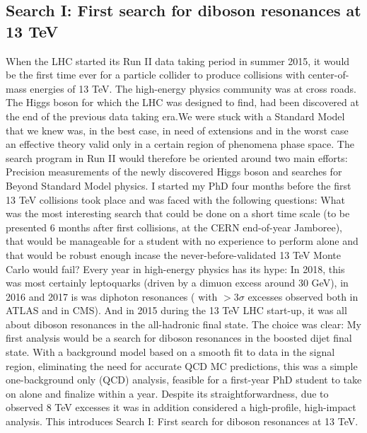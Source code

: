 \vspace*{\fill}
\begin{centering}
\section*{Search I: First search for diboson resonances at 13 TeV}
When the LHC started its Run II data taking period in summer 2015, it would be the first time ever for a particle collider to produce collisions with center-of-mass energies of 13 TeV. The high-energy physics community was at cross roads. The Higgs boson for which the LHC was designed to find, had been discovered at the end of the previous data taking era.We were stuck with a Standard Model that we knew was, in the best case, in need of extensions and in the worst case an effective theory valid only in a certain region of phenomena phase space. The search program in Run II would therefore be oriented around two main efforts: Precision measurements of the newly discovered Higgs boson and searches for Beyond Standard Model physics.\newline\newline
I started my PhD four months before the first 13 TeV collisions took place and was faced with the following questions:
What was the most interesting search that could be done on a short time scale (to be presented 6 months after first collisions, at the CERN end-of-year Jamboree), that would be manageable for a student with no experience to perform alone and that would be robust enough incase the never-before-validated 13 TeV Monte Carlo would fail? \newline\newline
Every year in high-energy physics has its hype: In 2018, this was most certainly leptoquarks (driven by a dimuon excess around 30 GeV), in 2016 and 2017 is was diphoton resonances ( with  $>3\sigma$ excesses observed both in ATLAS and in CMS). And in 2015 during the 13 TeV LHC start-up, it was all about diboson resonances in the all-hadronic final state.\newline\newline
The choice was clear: My first analysis would be a search for diboson resonances in the boosted dijet final state. With a background model based on a smooth fit to data in the signal region, eliminating the need for accurate QCD MC predictions, this was a simple one-background only (QCD) analysis, feasible for a first-year PhD student to take on alone and finalize within a year. Despite its straightforwardness, due to observed 8 TeV excesses it was in addition considered a high-profile, high-impact analysis.
\newline\newline
This introduces Search I: First search for diboson resonances at 13 TeV.
\end{centering}

